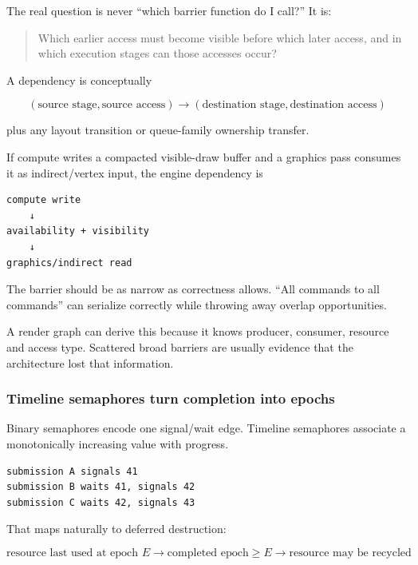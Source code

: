 The real question is never ``which barrier function do I call?'' It is:

\begin{quote}
Which earlier access must become visible before which later access, and in which execution stages can those accesses occur?
\end{quote}

A dependency is conceptually

\[
\boxed{
(\text{source stage},\text{source access})
\rightarrow
(\text{destination stage},\text{destination access})
}
\]

plus any layout transition or queue-family ownership transfer.

If compute writes a compacted visible-draw buffer and a graphics pass consumes it as indirect/vertex input, the engine dependency is

\begin{verbatim}
compute write
    ↓
availability + visibility
    ↓
graphics/indirect read
\end{verbatim}

The barrier should be as narrow as correctness allows. ``All commands to all commands'' can serialize correctly while throwing away overlap opportunities.

A render graph can derive this because it knows producer, consumer, resource and access type. Scattered broad barriers are usually evidence that the architecture lost that information.

\subsubsection{Timeline semaphores turn completion into epochs}\label{05-engine-i-ch023-timeline-semaphores-turn-completion-into-epochs}

\hypertarget{05-engine-i-ch023-timeline-semaphores-turn-completion-into-epochs}{}

Binary semaphores encode one signal/wait edge. Timeline semaphores associate a monotonically increasing value with progress.

\begin{verbatim}
submission A signals 41
submission B waits 41, signals 42
submission C waits 42, signals 43
\end{verbatim}

That maps naturally to deferred destruction:

\[
\boxed{
\text{resource last used at epoch }E
\rightarrow
\text{completed epoch}\ge E
\rightarrow
\text{resource may be recycled}
}
\]

